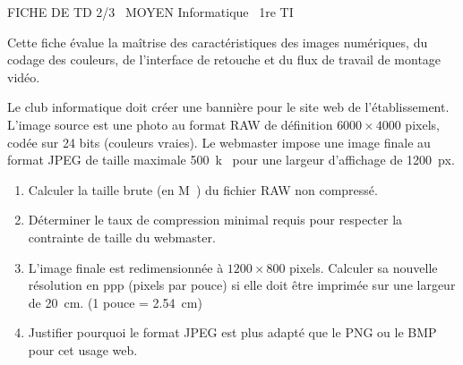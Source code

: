 \documentclass[11pt]{article}
\begin{document}
\begin{tcolorbox}[enhanced,colback=popink,colframe=popink,arc=10pt,boxrule=0pt,left=12pt,right=12pt,top=9pt,bottom=9pt]
{\color{white}\popxbold\small FICHE DE TD 2/3 \textbullet\ MOYEN \hfill Informatique \textbullet\ 1re TI\par}
\end{tcolorbox}
\vspace{4pt}
Cette fiche évalue la maîtrise des caractéristiques des images numériques, du codage des couleurs, de l'interface de retouche et du flux de travail de montage vidéo.

\begin{exercice}
Le club informatique doit créer une bannière pour le site web de l'établissement. L'image source est une photo au format RAW de définition $6000 \times 4000$ pixels, codée sur 24 bits (couleurs vraies). Le webmaster impose une image finale au format JPEG de taille maximale \SI{500}{k\byte} pour une largeur d'affichage de \SI{1200}{px}.
\begin{enumerate}
    \item Calculer la taille brute (en \unit{M\byte}) du fichier RAW non compressé.
    \item Déterminer le taux de compression minimal requis pour respecter la contrainte de taille du webmaster.
    \item L'image finale est redimensionnée à $1200 \times 800$ pixels. Calculer sa nouvelle résolution en ppp (pixels par pouce) si elle doit être imprimée sur une largeur de \SI{20}{cm}. (1 pouce = \SI{2,54}{cm})
    \item Justifier pourquoi le format JPEG est plus adapté que le PNG ou le BMP pour cet usage web.
\end{enumerate}
\end{exercice}
\end{document}
